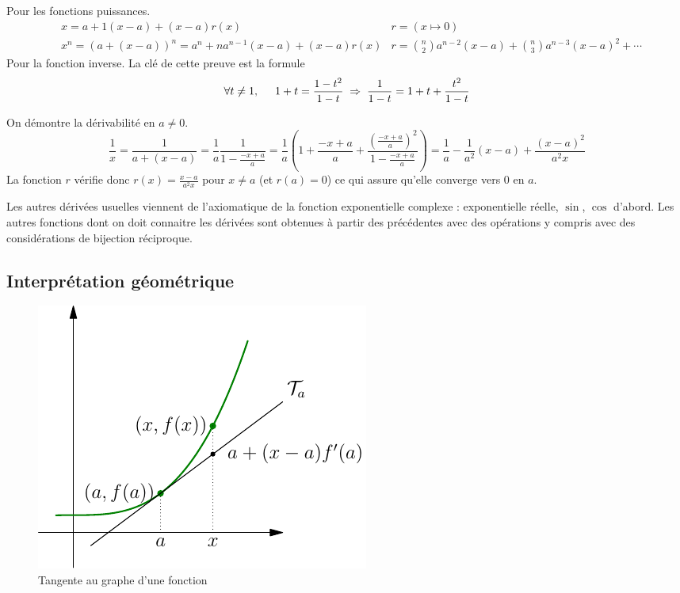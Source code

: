 \begin{demo}
Pour les fonctions puissances.
\begin{align*}
  &x = a + 1(x-a) + (x-a)r(x)            &r = \left( x\mapsto 0\right) \\
  &x^n = \left( a+(x-a)\right)^n = a^n + na^{n-1}(x-a) + (x-a)r(x) &r = \binom{n}{2}a^{n-2}(x-a) + \binom{n}{3}a^{n-3}(x-a)^2 + \cdots 
\end{align*}
Pour la fonction inverse.\newline
La clé de cette preuve est la formule
\begin{displaymath}
  \forall t\neq 1,\hspace{0.5cm} 1+t = \frac{1-t^2}{1-t} \; \Rightarrow \; \frac{1}{1-t} = 1 + t + \frac{t^2}{1-t}
\end{displaymath}

  On démontre la dérivabilité en $a\neq0$.
\begin{displaymath}
  \frac{1}{x} = \frac{1}{a+(x-a)} = \frac{1}{a} \frac{1}{1-\frac{-x+a}{a}} 
  = \frac{1}{a}\left(1 + \frac{-x+a}{a} + \frac{(\frac{-x+a}{a})^2}{1-\frac{-x+a}{a}}\right) 
  = \frac{1}{a} -\frac{1}{a^2}(x-a) + \frac{(x-a)^2}{a^2x}
\end{displaymath}
La fonction $r$ vérifie donc $r(x) = \frac{x-a}{a^2x}$ pour $x\neq a$ (et $r(a)=0$) ce qui assure qu'elle converge vers $0$ en $a$.
\end{demo}

Les autres dérivées usuelles viennent de l'axiomatique de la fonction exponentielle complexe : exponentielle réelle,  $\sin$, $\cos$ d'abord. Les autres fonctions dont on doit connaitre les dérivées sont obtenues à partir des précédentes avec des opérations y compris avec des considérations de bijection réciproque.

\subsection{Interprétation géométrique}
\begin{figure}[h]
 \centering
 \includegraphics{./C2070_1.pdf}
 \caption{Tangente au graphe d'une fonction}
 \label{fig:C2070_1}
\end{figure}

